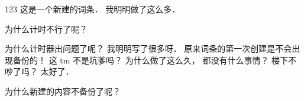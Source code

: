 
123 这是一个新建的词条．
我明明做了这么多．

为什么计时不行了呢？

为什么计时器出问题了呢？ 我明明写了很多呀． 原来词条的第一次创建是不会出现备份的！ 这 tm 不是坑爹吗？ 为什么做了这么久， 都没有什么事情？ 楼下不吵了吗？ 太好了．

为什么新建的内容不备份了呢？
